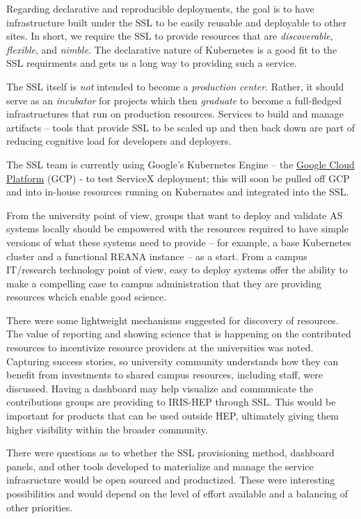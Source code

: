 \documentclass[11pt,letterpaper,fleqn]{article}
\begin{document}
Regarding declarative and reproducible deployments, the goal is to have infrastructure built under the SSL to be easily reusable and deployable to other sites. In short, we require the SSL to provide resources that are \textit{discoverable}, \textit{flexible}, and \textit{nimble}. The declarative nature of Kubernetes is a good fit to the SSL requirments and gets us a long way to providing such a service.

The SSL itself is \textit{not} intended to become a \textit{production center}. Rather, it should serve as an \textit{incubator} for projects which then \textit{graduate} to become a full-fledged infrastructures that run on production resources. Services to build and manage artifacts -- tools that provide SSL to be scaled up and then back down are part of reducing cognitive load for developers and deployers.

The SSL team is currently using Google's Kubernetes Engine -- the \href{https://cloud.google.com}{Google Cloud Platform} (GCP) - to test ServiceX deployment; this will soon be pulled off GCP and into in-house resources running on Kubernates and integrated into the SSL.

From the university point of view, groups that want to deploy and validate AS systems locally should be empowered with the resources required to have simple versions of what these systems need to provide -- for example, a base Kubernetes cluster and a functional {\sf REANA} instance -- as a start. From a campus IT/research technology point of view, easy to deploy systems offer the ability to make a compelling case to campus administration that they are providing resources whcich enable good science.

There were some lightweight mechanisms suggested for discovery of resources.   The value of reporting and showing science that is happening on the contributed resources to incentivize resource providers at the universities was noted.  Capturing success stories, so university community understands how they can benefit from investments to shared campus resources, including staff, were discussed. Having a dashboard may help visualize and communicate the contributions groups are providing to IRIS-HEP through SSL. This would be important for products that can be used outside HEP, ultimately giving them higher visibility within the broader community.

There were questions as to whether the SSL provisioning method, dashboard panels, and other tools developed to materialize and manage the service infrasructure would be open sourced and productized. These were interesting possibilities and would depend on the level of effort available and a balancing of other priorities.
\end{document}
